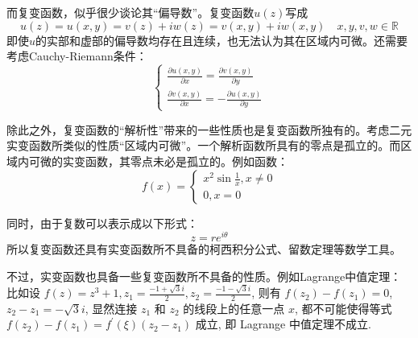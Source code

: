 \documentclass[12pt, a4paper, oneside]{ctexart}
\begin{document}
而复变函数，似乎很少谈论其“偏导数”。复变函数$u(z)$写成
$$
u(z)=u(x,y)=v(z)+iw(z)=v(x,y)+iw(x,y) \quad x,y,v,w \in \mathbb{R}
$$
即使$u$的实部和虚部的偏导数均存在且连续，也无法认为其在区域内可微。还需要考虑Cauchy-Riemann条件：
$$
\left\{
\begin{aligned}
    \frac{\displaystyle \partial u(x,y)}{ \displaystyle \partial x}=\frac{\displaystyle \partial v(x,y)}{\displaystyle \partial y} \\
    \frac{\displaystyle \partial v(x,y)}{ \displaystyle \partial x}=-\frac{\displaystyle \partial u(x,y)}{\displaystyle \partial y}
\end{aligned}
\right.
$$

除此之外，复变函数的“解析性”带来的一些性质也是复变函数所独有的。考虑二元实变函数所类似的性质“区域内可微”。一个解析函数所具有的零点是孤立的。而区域内可微的实变函数，其零点未必是孤立的。例如函数：
\begin{equation*}
    f(x)=\left\{\begin{array}{l}
    x^{2} \sin \frac{1}{x}, x \neq 0 \\
    0, x=0
    \end{array}\right.
\end{equation*}

同时，由于复数可以表示成以下形式：
$$
z=re^{i\theta}
$$
所以复变函数还具有实变函数所不具备的柯西积分公式、留数定理等数学工具。

不过，实变函数也具备一些复变函数所不具备的性质。例如Lagrange中值定理：
比如设 $f(z)=z^{3}+1, z_{1}=\frac{-1+\sqrt{3} i}{2}, z_{2}=\frac{-1-\sqrt{3} i}{2}$, 则有 $f\left(z_{2}\right)-f\left(z_{1}\right)=0$, $z_{2}-z_{1}=-\sqrt{3} i$, 显然连接 $z_{1}$ 和 $z_{2}$ 
的线段上的任意一点 $x$, 都不可能使得等式 $f\left(z_{2}\right)-f\left(z_{1}\right)=f^{\prime}(\xi)\left(z_{2}-z_{1}\right)$ 成立, 即 Lagrange 中值定理不成立.
\end{document}
